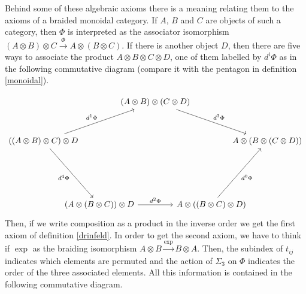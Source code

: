 \documentclass[TFM.tex]{subfiles}
\begin{document}
	Behind some of these algebraic axioms there is a meaning relating them to the axioms of a braided monoidal category. If $A$, $B$ and $C$ are objects of such a category, then $\Phi$ is interpreted as the associator isomorphism $(A\otimes B)\otimes C\xrightarrow{\Phi} A\otimes (B\otimes C)$. If there is another object $D$, then there are five ways to associate the product $A\otimes B\otimes C\otimes D$, one of them labelled by $d^i\Phi$ as in the following commutative diagram (compare it with the pentagon in definition \ref{monoidal}).
	
	\[
	\begin{tikzcd}[column sep=-25, row sep=30]
	&                                                                     & (A\otimes B)\otimes (C\otimes D) \arrow[rrd, "{d^3\Phi }"] &                                                                         &                                \\
	((A\otimes B)\otimes C)\otimes D \arrow[rru, "{d^1\Phi}"] \arrow[rdd, "d^4\Phi"'] &                                                                     &                                                                      &                                                                         & A\otimes(B\otimes(C\otimes D)) \\
	&                                                                     &                                                                      &                                                                         &                                \\
	& (A\otimes (B\otimes C))\otimes D \arrow[rr, "{d^2\Phi}"] &                                                                      & A\otimes ((B\otimes C)\otimes D) \arrow[ruu, "d^0\Phi"'] &                               
	\end{tikzcd}
	\]
Then, if we write composition as a product in the inverse order we get the first axiom of definition \ref{drinfeld}. In order to get the second axiom, we have to think if $\exp$ as the braiding isomorphism $A\otimes B\xrightarrow{\exp} B\otimes A$. Then, the subindex of $t_{ij}$ indicates which elements are permuted and the action of $\Sigma_3$ on $\Phi$ indicates the order of the three associated elements. All this information is contained in the following commutative diagram.
\end{document}
